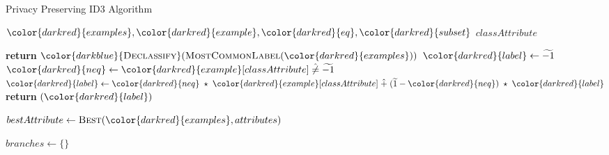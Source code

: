 \begin{algorithm}[H]
\caption{Privacy Preserving ID3 Algorithm}\label{a:id3-pp}
\begin{algorithmic}[1]
\renewcommand{\algorithmicrequire}{\textbf{Private Vars:}}
\Require ${\color{darkred}{examples}}, {\color{darkred}{example}}, {\color{darkred}{eq}}, {\color{darkred}{subset}}$
\renewcommand{\algorithmicrequire}{\textbf{Global Vars:}}
\Require $classAttribute$

         \State \textbf{return} ${\color{darkblue}{\textsc{Declassify}}}(\textsc{MostCommonLabel}({\color{darkred}{examples}}))$
       \State ${\color{darkred}{label}} \gets \enc{-1}$
       \For{${\color{darkred}{example}} \in {\color{darkred}{examples}}$}
           \State ${\color{darkred}{neq}} \gets {\color{darkred}{example}}[classAttribute] \hneq \enc{-1}$
           \State ${\color{darkred}{label}} \gets {\color{darkred}{neq}} \hmul {\color{darkred}{example}}[classAttribute] \hplus (\enc{1} - {\color{darkred}{neq}}) \hmul {\color{darkred}{label}} $
       \EndFor
       \State \textbf{return} {{}}$({\color{darkred}{label}})$
    \EndIf

    \State $bestAttribute \gets \textsc{Best}({\color{darkred}{examples}}, attributes)$


    \State $branches \gets \{\}$


\end{algorithmic}
\end{algorithm}
